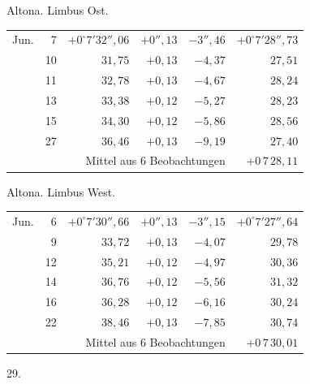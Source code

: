 \noindent\begin{minipage}[t]{.495\textwidth}\centering Altona. Limbus Ost.\par\smallskip
{\scriptsize\setlength{\tabcolsep}{1pt}\renewcommand{\arraystretch}{1.2}\begin{tabular}{lr|r|r|r|r|}
Jun.&7&$+0^\circ7'32''{,}06$&$+0''{,}13$&$-3''{,}46$&$+0^\circ7'28''{,}73$\\
&10&$31{,}75$&$+0{,}13$&$-4{,}37$&$27{,}51$\\
&11&$32{,}78$&$+0{,}13$&$-4{,}67$&$28{,}24$\\
&13&$33{,}38$&$+0{,}12$&$-5{,}27$&$28{,}23$\\
&15&$34{,}30$&$+0{,}12$&$-5{,}86$&$28{,}56$\\
&27&$36{,}46$&$+0{,}13$&$-9{,}19$&$27{,}40$\\
\cline{6-6}\multicolumn{5}{r}{Mittel aus 6 Beobachtungen}&$+0\,7\,28{,}11$
\end{tabular}}\end{minipage}\hfill\begin{minipage}[t]{.495\textwidth}\centering Altona. Limbus West.\par\smallskip
{\scriptsize\setlength{\tabcolsep}{1pt}\renewcommand{\arraystretch}{1.2}\begin{tabular}{lr|r|r|r|r}
Jun.&6&$+0^\circ7'30''{,}66$&$+0''{,}13$&$-3''{,}15$&$+0^\circ7'27''{,}64$\\
&9&$33{,}72$&$+0{,}13$&$-4{,}07$&$29{,}78$\\
&12&$35{,}21$&$+0{,}12$&$-4{,}97$&$30{,}36$\\
&14&$36{,}76$&$+0{,}12$&$-5{,}56$&$31{,}32$\\
&16&$36{,}28$&$+0{,}12$&$-6{,}16$&$30{,}24$\\
&22&$38{,}46$&$+0{,}13$&$-7{,}85$&$30{,}74$\\
\cline{6-6}\multicolumn{5}{r}{Mittel aus 6 Beobachtungen}&$+0\,7\,30{,}01$
\end{tabular}}\end{minipage}
\par\vspace{4mm}
\begin{center}29.\end{center}

